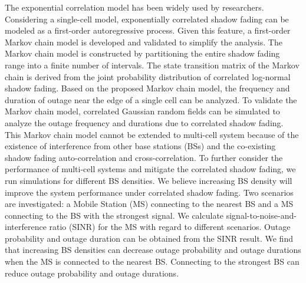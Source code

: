 \par The exponential correlation model \cite{gudmundson1991correlation} has been widely used by researchers. Considering a single-cell model, exponentially correlated shadow fading can be modeled as a first-order autoregressive process. Given this feature, a first-order Markov chain model is developed and validated  to simplify the analysis. The Markov chain model is constructed by partitioning the entire shadow fading range into a finite number of intervals. The state transition matrix of the Markov chain is derived from the joint probability distribution of correlated log-normal shadow fading. Based on the proposed Markov chain model, the frequency and duration of outage near the edge of a single cell can be analyzed. To validate the Markov chain model, correlated Gaussian random fields can be simulated to analyze the outage frequency and durations due to correlated shadow fading. 
This Markov chain model cannot be extended to multi-cell system because of the existence of interference from other base stations (BSs) and the co-existing shadow fading auto-correlation and cross-correlation. To further consider the performance of multi-cell systems and mitigate the correlated shadow fading, we run simulations for different BS densities. We believe increasing BS density will improve the system performance under correlated shadow fading. Two scenarios are investigated: a Mobile Station (MS) connecting to the nearest BS and a MS connecting to the BS with the strongest signal. We calculate signal-to-noise-and-interference ratio (SINR) for the MS with regard to different scenarios. Outage probability and outage duration can be obtained from the SINR result. We find that increasing BS densities can decrease outage probability and outage durations when the MS is connected to the nearest BS. Connecting to the strongest BS can reduce outage probability and outage durations. 

